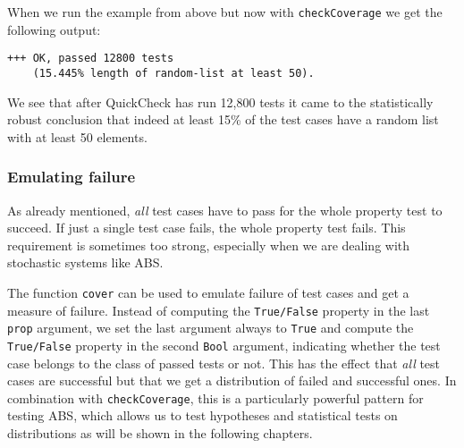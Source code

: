 When we run the example from above but now with \texttt{checkCoverage} we get the following output:

\begin{verbatim}
+++ OK, passed 12800 tests 
    (15.445% length of random-list at least 50).
\end{verbatim}

We see that after QuickCheck has run 12,800 tests it came to the statistically robust conclusion that indeed at least 15\% of the test cases have a random list with at least 50 elements. 

\subsubsection*{Emulating failure}
As already mentioned, \textit{all} test cases have to pass for the whole property test to succeed. If just a single test case fails, the whole property test fails. This requirement is sometimes too strong, especially when we are dealing with stochastic systems like ABS.

The function \texttt{cover} can be used to emulate failure of test cases and get a measure of failure. Instead of computing the \texttt{True/False} property in the last \texttt{prop} argument, we set the last argument always to \texttt{True} and compute the \texttt{True/False} property in the second \texttt{Bool} argument, indicating whether the test case belongs to the class of passed tests or not. This has the effect that \textit{all} test cases are successful but that we get a distribution of failed and successful ones. In combination with \texttt{checkCoverage}, this is a particularly powerful pattern for testing ABS, which allows us to test hypotheses and statistical tests on distributions as will be shown in the following chapters.